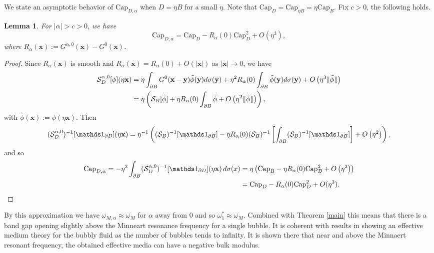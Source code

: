 \documentclass[11pt]{article}
\numberwithin{equation}{section}
\newtheorem{lem}{Lemma}[section]
\def\bx{{\mathbf{x}}}
\def\by{{\mathbf{y}}}
\def\capacity{{\mathrm{Cap}}}
\newcommand\1{{\ensuremath {\mathds 1} }}
\begin{document}
{{We state an asymptotic behavior of $ \capacity_{D,\alpha}$ when $D= \eta B$ for a small $\eta$. {Note that $\capacity_{D}= \capacity_{\eta B} = \eta \capacity_{B}$.}
Fix $c>0$, the following holds. 
\begin{lem} \label{lem-dilute} For $|\alpha|> c >0$, we have
\begin{equation}  
 \capacity_{D,\alpha} =  \capacity_{D} - R_\alpha(0)  \capacity_{D} ^2+ O(\eta^3),
 \end{equation}
 where $R_\alpha(\bx):=G^{\alpha,0} (\bx) - G^0(\bx) $.
\end{lem}
\begin{proof}
Since $R_\alpha(\bx)$ is smooth and $R_\alpha(\bx) = R_\alpha(0) + O(|\bx|)$ as $|\bx| \to 0$, we have
\begin{align*} \mathcal{S}_D^{\alpha,0}[\phi] (\eta\bx)
&= \eta \int_{\p B} G^0( \bx - \by) \tilde \phi(\by) d\sigma(\by) + \eta^2 R_\alpha(0)\int_{\p B} \tilde\phi (\by)d\sigma(\by)+ O\left(\eta^3 \|\tilde\phi\| \right)\\
&=\eta\left(\mathcal{S}_B[\tilde\phi] +  \eta R_\alpha(0)\int_{\p B} \tilde\phi  + O\left(\eta^2 \|\tilde\phi\| \right) \right),\end{align*}
with $\tilde \phi(\bx) := \phi(\eta \bx)$. Then
\begin{equation}
(\mathcal{S}_D^{\alpha,0})^{-1}[\1_{\p D}](\eta \bx)= \eta^{-1} \left((\mathcal{S}_B)^{-1}[\1_{\p B}] - \eta R_\alpha(0)(\mathcal{S}_B)^{-1}\left[\int_{\p B} (\mathcal{S}_B)^{-1}[\1_{\p B}] \right] + O\left(\eta^2 \right) \right),
\end{equation}
and so
\begin{align*}
 \capacity_{D,\alpha} =-\eta^2 \int_{\p B}(\mathcal{S}_D^{\alpha,0})^{-1}[\1_{\p D}](\eta \bx)\, d\sigma(x) &= \eta \left( \capacity_{B} - \eta R_\alpha(0) \capacity_{B}^2 + O\left(\eta^2 \right) \right)\\
 &=  \capacity_{D} - R_\alpha(0)  \capacity_{D} ^2+ O(\eta^3).
\end{align*}
\end{proof}

By this approximation we have $ \omega_{M,\alpha} \approx \omega_M$ for $\alpha$ away from $0$ and so $\omega_1^* \approx \omega_M$. Combined with Theorem \ref{main} this means that there is a band gap opening slightly above the Minneart resonance frequency  for a single bubble. It is coherent with results in \cite{Ammari_Hai} showing an effective medium theory for the bubbly fluid as the number of bubbles tends to infinity. It is shown there that near and above the Minnaert resonant frequency, the obtained effective media can have a negative {bulk modulus}.

}}
\end{document}
